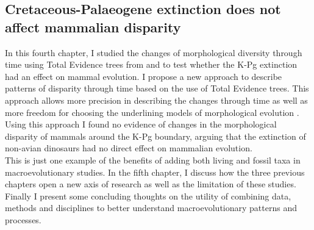 \subsection{Cretaceous-Palaeogene extinction does not affect mammalian disparity}
In this fourth chapter, I studied the changes of morphological diversity \citep[or disparity;][]{Wills1994} through time using Total Evidence trees from \cite{slaterphylogenetic2013} and \cite{beckancient2014} to test whether the K-Pg extinction had an effect on mammal evolution.
I propose a new approach to describe patterns of disparity through time based on the use of Total Evidence trees.
This approach allows more precision in describing the changes through time as well as more freedom for choosing the underlining models of morphological evolution \citep[e.g. punctuated or gradual;][]{Hunt21042015}.
Using this approach I found no evidence of changes in the morphological disparity of mammals around the K-Pg boundary, arguing that the extinction of non-avian dinosaurs had no direct effect on mammalian evolution.\\

This is just one example of the benefits of adding both living and fossil taxa in macroevolutionary studies.
In the fifth chapter, I discuss how the three previous chapters open a new axis of research %
as well as the limitation of these studies.
Finally I present some concluding thoughts on the utility of combining data, methods and disciplines to better understand macroevolutionary patterns and processes.

%
